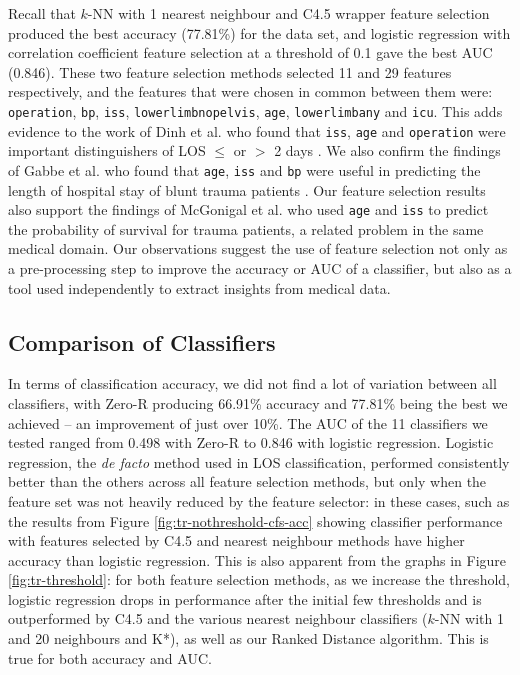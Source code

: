 \documentclass{article}
\begin{document}
Recall that $k$-NN with 1 nearest neighbour and C4.5 wrapper feature
selection produced the best accuracy (77.81\%) for the data set, and
logistic regression with correlation coefficient feature selection at a
threshold of 0.1 gave the best AUC (0.846). These two feature selection
methods selected 11 and 29 features respectively, and the features that
were chosen in common between them were: \texttt{operation}, \texttt{bp},
\texttt{iss}, \texttt{lowerlimbnopelvis}, \texttt{age}, \texttt{lowerlimbany}
and \texttt{icu}. This adds evidence to the work of Dinh et al. who found
that \texttt{iss}, \texttt{age} and \texttt{operation} were important
distinguishers of LOS $\leq$ or $>$ 2 days \cite{Dinh2013a}. We also
confirm the findings of Gabbe et al. who found that \texttt{age},
\texttt{iss} and \texttt{bp} were useful in predicting the length of
hospital stay of blunt trauma patients \cite{Gabbe2005}. Our feature
selection results also
support the findings of McGonigal et al. \cite{McGonigal1993} who used
\texttt{age} and
\texttt{iss} to predict the probability of survival for trauma patients, a
related problem in the same medical domain.
Our observations suggest the use of feature selection not only as a
pre-processing step to improve the accuracy or AUC of a classifier, but also
as a tool used independently to extract insights from medical data.

\subsection{Comparison of Classifiers}
In terms of classification accuracy, we did not find a lot of variation
between all classifiers, with Zero-R producing 66.91\% accuracy and 77.81\%
being the best we achieved -- an improvement of just over 10\%. The AUC of
the 11 classifiers we tested ranged from 0.498 with Zero-R to 0.846 with
logistic regression. Logistic regression, the \textit{de facto} method
used in LOS classification, performed consistently better than the others
across all feature
selection methods, but only when the feature set was not heavily reduced by
the feature selector: in these cases, such as the results from Figure
\ref{fig:tr-nothreshold-cfs-acc} showing classifier performance with features
selected by C4.5 and nearest
neighbour methods have higher accuracy than logistic regression. This is also
apparent from the graphs in Figure \ref{fig:tr-threshold}: for both
feature selection methods, as we increase the threshold, logistic regression
drops in performance after the initial few thresholds and is outperformed by
C4.5 and the various nearest neighbour classifiers ($k$-NN with 1 and 20
neighbours and K*), as well as our Ranked Distance algorithm.
This is true for both accuracy and AUC.
\end{document}
